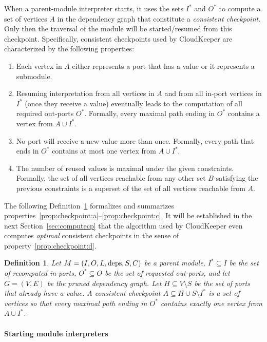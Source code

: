 \documentclass[paper=letter,fontsize=11pt,captions=tableheading]{scrartcl}
\numberwithin{equation}{section}
\theoremstyle{algorithm}
\theoremstyle{plain}
\newtheorem{definition}[equation]{Definition}
\theoremstyle{nonumberplain}
\begin{document}
When a parent-module interpreter starts, it uses the sets $I^*$ and $O^*$ to compute a set of vertices $A$ in the dependency graph that constitute a \emph{consistent checkpoint}. Only then the traversal of the module will be started/resumed from this checkpoint. Specifically, consistent checkpoints used by CloudKeeper are characterized by the following properties:
%
\begin{enumerate}
	\item \label{prop:checkpoint:a} Each vertex in $A$ either represents a port that has a value or it represents a submodule.
	\item \label{prop:checkpoint:b} Resuming interpretation from all vertices in $A$ and from all in-port vertices in $I^*$ (once they receive a value) eventually leads to the computation of all required out-ports $O^*$. Formally, every maximal path ending in $O^*$ contains a vertex from $A \cup I^*$.
	\item \label{prop:checkpoint:c} No port will receive a new value more than once. Formally, every path that ends in $O^*$ contains at most one vertex from $A \cup I^*$.
	\item \label{prop:checkpoint:d} The number of reused values is maximal under the given constraints. Formally, the set of all vertices reachable from any other set $B$ satisfying the previous constraints is a superset of the set of all vertices reachable from $A$.
\end{enumerate}
%
The following Definition~\ref{def:consistentcp} formalizes and summarizes properties~\eqref{prop:checkpoint:a}--\eqref{prop:checkpoint:c}. It will be established in the next Section~\ref{sec:computecp} that the algorithm used by CloudKeeper even computes \emph{optimal} consistent checkpoints in the sense of property~\eqref{prop:checkpoint:d}.

\begin{definition} \label{def:consistentcp}
	Let $M = (I, O, L, \operatorname{deps}, S, C)$ be a parent module, $I^* \subseteq I$ be the set of recomputed in-ports, $O^* \subseteq O$ be the set of requested out-ports, and let $G = (V,E)$ be the pruned dependency graph. Let $H \subseteq V \setminus S$ be the set of ports that already have a value. A \emph{consistent checkpoint} $A \subseteq H \cup S \setminus I^*$ is a set of vertices so that every maximal path ending in $O^*$ contains exactly one vertex from $A \cup I^*$.
\end{definition}

\paragraph{Starting module interpreters}
\end{document}
